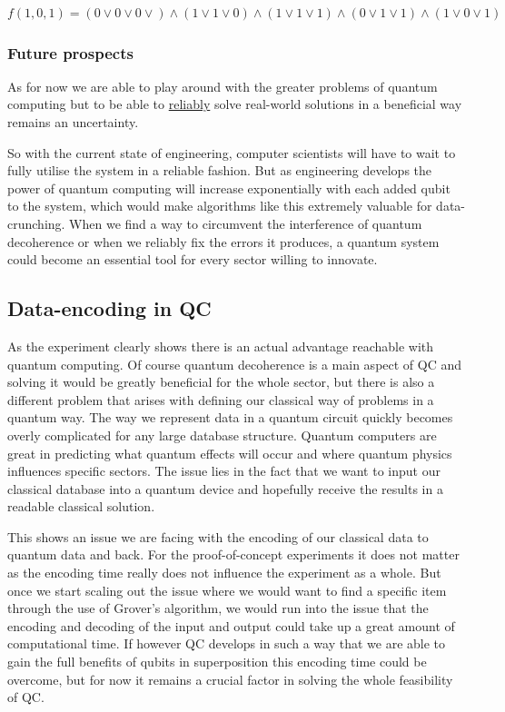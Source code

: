 $f(1,0,1) = (0 \vee 0 \vee 0 \vee) \wedge (1 \vee 1 \vee 0)  \wedge ( 1 \vee 1 \vee  1) \wedge ( 0 \vee 1 \vee 1) \wedge  ( 1 \vee 0 \vee  1)$

\subsubsection{Future prospects}

As for now we are able to play around with the greater problems of quantum computing but to be able to \underline{reliably} solve real-world solutions in a beneficial way remains an uncertainty.

So with the current state of engineering, computer scientists will have to wait to fully utilise the system in a reliable fashion. But as engineering develops the power of quantum computing will increase exponentially with each added qubit to the system, which would make algorithms like this extremely valuable for data-crunching. When we find a way to circumvent the interference of quantum decoherence or when we reliably fix the errors it produces, a quantum system could become an essential tool for every sector willing to innovate. 



\subsection{Data-encoding in QC}

As the experiment clearly shows there is an actual advantage reachable with quantum computing. Of course quantum decoherence is a main aspect of QC and solving it would be greatly beneficial for the whole sector, but there is also a different problem that arises with defining our classical way of problems in a quantum way. The way we represent data in a quantum circuit quickly becomes overly complicated for any large database structure. Quantum computers are great in predicting what quantum effects will occur and where quantum physics influences specific sectors. The issue lies in the fact that we want to input our classical database into a quantum device and hopefully receive the results in a readable classical solution. 

This shows an issue we are facing with the encoding of our classical data to quantum data and back. For the proof-of-concept experiments it does not matter as the encoding time really does not influence the experiment as a whole. But once we start scaling out the issue where we would want to find a specific item through the use of Grover's algorithm, we would run into the issue that the encoding and decoding of the input and output could take up a great amount of computational time. If however QC develops in such a way that we are able to gain the full benefits of qubits in superposition this encoding time could be overcome, but for now it remains a crucial factor in solving the whole feasibility of QC.



